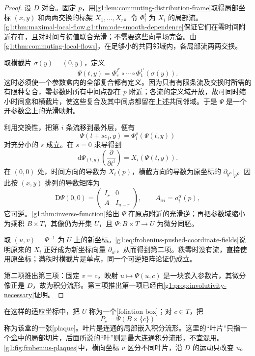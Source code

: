 \begin{proof}
	设 \(D\) 对合。固定 \(p\)，用\cref{g1:lem:commuting-distribution-frame}取得局部坐标 \((x,y)\) 和两两交换的标架 \(X_1,\ldots,X_r\)。令 \(\Phi_i^t\) 为 \(X_i\) 的局部流。\cref{g1:thm:maximal-local-flow,g1:thm:ode-smooth-dependence}保证它们在零时间附近存在，且对时间与初值联合光滑；不需要这些向量场完备。由\cref{g1:thm:commuting-local-flows}，在足够小的共同邻域内，各局部流两两交换。

	取横截片 \(\sigma(y)=(0,y)\)，定义
	\begin{equation}\label{g1:eq:frobenius-flow-coordinates}
		\Psi(t,y)=\Phi_r^{t^r}\circ\cdots\circ\Phi_1^{t^1}(\sigma(y)).
	\end{equation}
	这时必须使一个参数盒内的全部复合都有定义。因为只有有限条流及交换时所需的有限种复合，零参数时所有中间点都在 \(p\) 附近；各流的定义域开放，故可同时缩小时间盒和横截片，使这些复合及其中间点都留在上述共同邻域。于是 \(\Psi\) 是一个开参数盒上的光滑映射。

	利用交换性，把第 \(i\) 条流移到最外层，便有
	\[
		\Psi(t+s e_i,y)=\Phi_i^s(\Psi(t,y))
	\]
	对充分小的 \(s\) 成立。在 \(s=0\) 求导得到
	\begin{equation}\label{g1:eq:frobenius-pushed-coordinate-fields}
		\mathrm{d}\Psi_{(t,y)}\!\left(\frac{\partial}{\partial t^i}\right)
		=X_i(\Psi(t,y)).
	\end{equation}
	在 \((0,0)\) 处，时间方向的导数为 \(X_i(p)\)，横截方向的导数为原坐标的 \(\partial_{y^\alpha}|_p\)。因此按 \((x,y)\) 排列的导数矩阵为
	\[
		\mathrm{D}\Psi(0,0)=
		\begin{pmatrix}
			I_r&0\\
			A&I_{n-r}
		\end{pmatrix},
		\qquad A_{\alpha i}=a_i^\alpha(p),
	\]
	它可逆。\cref{g1:thm:inverse-function}给出 \(\Psi\) 在原点附近的光滑逆；再把参数域缩小为乘积 \(B\times T\)，其像仍为开集 \(U\)，且 \(\Psi:B\times T\to U\) 为微分同胚。

	取 \((u,v)=\Psi^{-1}\) 为 \(U\) 上的新坐标。\eqref{g1:eq:frobenius-pushed-coordinate-fields}说明原来的 \(X_i\) 正好成为新坐标向量 \(\partial_{u^i}\)，从而得到第二项。秩零时没有流，直接使用原坐标；满秩时横截片是单点，同一个可逆矩阵论证仍成立。

	第二项推出第三项：固定 \(v=c\)，映射 \(u\mapsto\Psi(u,c)\) 是一块嵌入参数片，其微分像正是 \(D\)，故为积分流形。第三项推出第一项已经由\cref{g1:prop:involutivity-necessary}证明。
\end{proof}

在这样的适应坐标中，把 \(U\) 称为一个[foliation box]；对 \(c\in T\)，把
\[
	P_c=\Psi(B\times\{c\})
\]
称为该盒的一张[plaque]。叶片是连通的局部嵌入积分流形。这里的“叶片”只指一个盒中的局部切片，后面所说的“叶”则是最大连通积分流形，不宜混用。\cref{g1:fig:frobenius-plaques}中，横向坐标 \(v\) 区分不同叶片，沿 \(D\) 的运动只改变 \(u\)。

